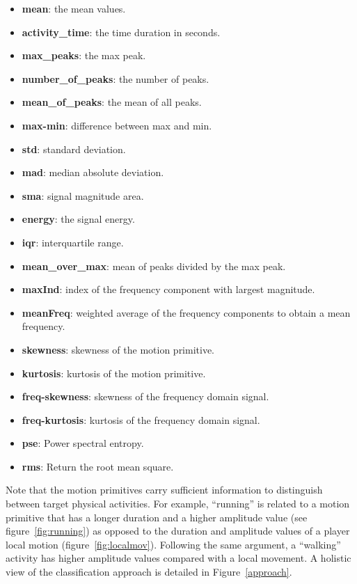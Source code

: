\begin{itemize}
\item \textbf{mean}:  the mean values.
\item \textbf{activity\_time}: the time duration in seconds.
\item \textbf{max\_peaks}:  the max peak.
\item \textbf{number\_of\_peaks}:  the number of peaks.
\item \textbf{mean\_of\_peaks}: the mean of all peaks.
\item \textbf{max-min}: difference between max and min.
\item \textbf{std}: standard deviation.
\item \textbf{mad}: median absolute deviation.
\item \textbf{sma}: signal magnitude area.
\item \textbf{energy}: the signal energy.
\item \textbf{iqr}: interquartile range.
\item \textbf{mean\_over\_max}: mean of peaks divided by the max peak.
\item \textbf{maxInd}: index of the frequency component with largest magnitude.
\item \textbf{meanFreq}:  weighted average of the frequency components to obtain a mean frequency.
\item \textbf{skewness}:  skewness of the motion primitive.
\item \textbf{kurtosis}:  kurtosis of the motion primitive.
\item \textbf{freq-skewness}: skewness of the frequency domain signal.
\item \textbf{freq-kurtosis}: kurtosis of the frequency domain signal.
\item \textbf{pse}: Power spectral entropy.
\item \textbf{rms}: Return the root mean square.
\end{itemize}


Note that the motion primitives carry sufficient information to distinguish between target physical activities. For example, ``running'' is related to a motion primitive that has a longer duration and a higher amplitude value (see figure~\ref{fig:running}) as opposed to the duration and amplitude values of a player local motion (figure~\ref{fig:localmov}). Following the same argument, a ``walking'' activity has higher amplitude values compared with a local movement. A holistic view of the classification approach is detailed in Figure~\ref{approach}. 

